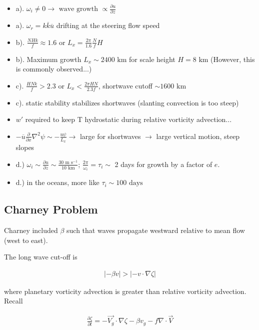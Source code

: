 \documentclass[a4paper,12pt]{article}
\begin{document}
\begin{itemize}
	\item a). $\omega_i \neq 0 \rightarrow \text{ wave growth } \propto \frac{\partial u}{\partial z}$
	\item a). $\omega_r = k\overline k\overline{u}$ drifting at the steering flow speed
	\item b). $\frac{NHk}{f} \approx 1.6$ or $L_x = \frac{2\pi}{1.6}\frac{N}{f}H$
	\item b). Maximum growth $L_x \sim 2400 \text{ km}$ for scale height $H = 8 \text{ km}$ (However, this is commonly observed...)
	\item c). $\frac{HNk}{f} > 2.3$ or $L_x < \frac{2\pi H N}{2.3 f}$, shortwave cutoff $\sim 1600 \text{ km}$
	\item c). static stability stabilizes shortwaves (slanting convection is too steep)
	\item $w'$ required to keep T hydrostatic during relative vorticity advection...
	\item $-\overline{u} \frac{\partial}{\partial x} \nabla^2 \psi \sim -\frac{u\psi}{L_x} \rightarrow$ large for shortwaves $\rightarrow$ large vertical motion, steep slopes
	\item d.) $\omega_i \sim \frac{\partial u}{\partial z} \sim \frac{30 \text{ m s}^{-1}}{10 \text { km}}$; $\frac{2\pi}{\omega_i} = \tau_i \sim$ 2 days for growth by a factor of $e$. 
	\item d.) in the oceans, more like $\tau_i \sim 100 \text{ days}$
\end{itemize}

\subsection*{Charney Problem}

Charney included $\beta$ such that waves propagate westward relative to mean flow (west to east).

The long wave cut-off is 

\begin{align*}
|-\beta v| > |-v \cdot \nabla\zeta|
\end{align*}

where planetary vorticity advection is greater than relative vorticity advection. Recall

\begin{align*}
\frac{\partial \zeta}{\partial t} = -\vec{V_g} \cdot \nabla \zeta - \beta v_g - f\nabla \cdot \vec{V}
\end{align*}
\end{document}

